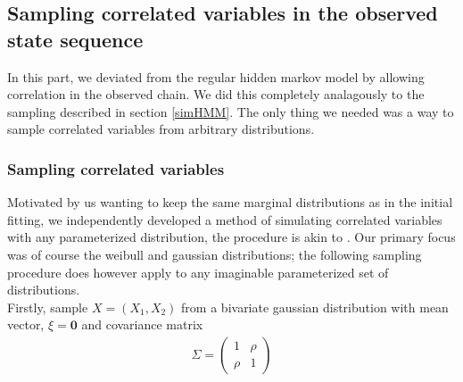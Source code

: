 \subsection{Sampling correlated variables in the observed state sequence}\label{correlatedVariables}
In this part, we deviated from the regular hidden markov model by allowing correlation in the observed chain. We did this completely analagously to the sampling described in section \ref{simHMM}. The only thing we needed was a way to sample correlated variables from arbitrary distributions.
\subsubsection{Sampling correlated variables}
Motivated by us wanting to keep the same marginal distributions as in the initial fitting, we independently developed a method of simulating correlated variables with any parameterized distribution, the procedure is akin to \cite{thomasWard}. Our primary focus was of course the weibull and gaussian distributions; the following sampling procedure does however apply to any imaginable parameterized set of distributions.\\ Firstly, sample $X = (X_1, X_2)$ from a bivariate gaussian distribution with mean vector, $\xi = \mathbf{0}$ and covariance matrix 
\begin{align}\Sigma = \begin{pmatrix}
    1 & \rho \\
    \rho & 1
\end{pmatrix}
\end{align}
